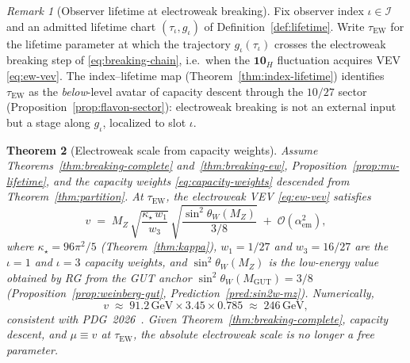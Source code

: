 \documentclass[11pt]{article}
\theoremstyle{plain}
\newtheorem{theorem}{Theorem}[section]
\theoremstyle{definition}
\theoremstyle{remark}
\newtheorem{remark}[theorem]{Remark}
\numberwithin{equation}{section}
\begin{document}
\begin{remark}[Observer lifetime at electroweak breaking]
\label{rmk:tau-ew}
Fix observer index $\iota\in\mathcal{I}$ and an admitted lifetime chart
$(\tau_\iota,g_\iota)$ of Definition~\ref{def:lifetime}. Write
$\tau_{\mathrm{EW}}$ for the lifetime parameter at which the trajectory
$g_\iota(\tau_\iota)$ crosses the electroweak breaking step of
\eqref{eq:breaking-chain}, i.e.\ when the $\mathbf{10}_H$ fluctuation
acquires VEV \eqref{eq:ew-vev}. The index--lifetime map
(Theorem~\ref{thm:index-lifetime}) identifies $\tau_{\mathrm{EW}}$ as the
\emph{below}-level avatar of capacity descent through the $10/27$ sector
(Proposition~\ref{prop:flavon-sector}): electroweak breaking is not an
external input but a stage along $g_\iota$, localized to slot $\iota$.
\end{remark}

\begin{theorem}[Electroweak scale from capacity weights]\label{thm:ew-scale-value}
Assume Theorems~\ref{thm:breaking-complete} and~\ref{thm:breaking-ew},
Proposition~\ref{prop:mu-lifetime}, and the capacity weights
\eqref{eq:capacity-weights} descended from Theorem~\ref{thm:partition}.
At $\tau_{\mathrm{EW}}$, the electroweak VEV \eqref{eq:ew-vev} satisfies
\begin{equation}\label{eq:v-capacity}
  v
  \;=\;
  M_Z\,
  \sqrt{\frac{\kappa_\star\,w_1}{w_3}}\,
  \sqrt{\frac{\sin^2\theta_W(M_Z)}{3/8}}
  \;+\;\mathcal{O}(\alpha_{\mathrm{em}}^2),
\end{equation}
where $\kappa_\star=96\pi^2/5$ (Theorem~\ref{thm:kappa}),
$w_1=1/27$ and $w_3=16/27$ are the $\iota=1$ and $\iota=3$ capacity weights,
and $\sin^2\theta_W(M_Z)$ is the low-energy value obtained by RG from the GUT
anchor $\sin^2\theta_W(M_{\mathrm{GUT}})=3/8$
(Proposition~\ref{prop:weinberg-gut}, Prediction~\ref{pred:sin2w-mz}).
Numerically,
\begin{equation}\label{eq:v-numeric}
  v
  \;\approx\;
  91.2\,\mathrm{GeV}\times 3.45\times 0.785
  \;\approx\;
  246\,\mathrm{GeV},
\end{equation}
consistent with PDG~2026~\cite{PDG2025}. Given Theorem~\ref{thm:breaking-complete}, capacity descent, and
$\mu\equiv v$ at $\tau_{\mathrm{EW}}$, the absolute electroweak scale is no
longer a free parameter.
\end{theorem}
\end{document}
